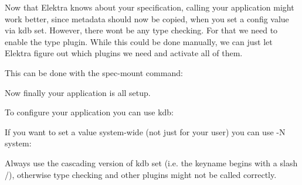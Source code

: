 Now that Elektra knows about your specification, calling your application might work better, since metadata should now be copied, when you set a config value via {\ttfamily kdb set}. However, there won\textquotesingle{}t be any type checking. For that we need to enable the {\ttfamily type} plugin. While this could be done manually, we can just let Elektra figure out which plugins we need and activate all of them.

This can be done with the {\ttfamily spec-\/mount} command\+:




Now finally your application is all setup.

To configure your application you can use {\ttfamily kdb}\+:




If you want to set a value system-\/wide (not just for your user) you can use {\ttfamily -\/N system}\+:




Always use the cascading version of {\ttfamily kdb set} (i.\+e. the keyname begins with a slash {\ttfamily /}), otherwise type checking and other plugins might not be called correctly. 
